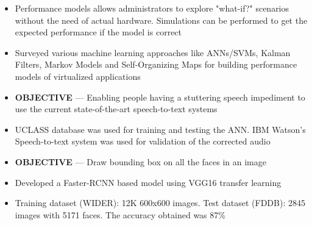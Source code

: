 \documentclass[10pt,a4paper]{altacv}
\begin{document}
\divider

\begin{itemize}
	\item Performance models allows administrators to explore "what-if?" scenarios without the need of actual hardware. Simulations can be performed to get the expected performance if the model is correct
	\item Surveyed various machine learning approaches like ANNs/SVMs, Kalman Filters, Markov Models and Self-Organizing Maps for building performance models of virtualized applications
\end{itemize}

\clearpage

\begin{itemize}
	\item \textbf{OBJECTIVE} --- Enabling people having a stuttering speech impediment to use the current state-of-the-art speech-to-text systems
	\item UCLASS database was used for training and testing the ANN. IBM Watson's Speech-to-text system was used for validation of the corrected audio
\end{itemize}

\divider

\begin{itemize}
	\item \textbf{OBJECTIVE} --- Draw bounding box on all the faces in an image
	\item Developed a Faster-RCNN based model using VGG16 transfer learning
	\item Training dataset (WIDER): 12K 600x600 images. Test dataset (FDDB): 2845 images with 5171 faces. The accuracy obtained was 87\%
\end{itemize}

\divider
\end{document}
